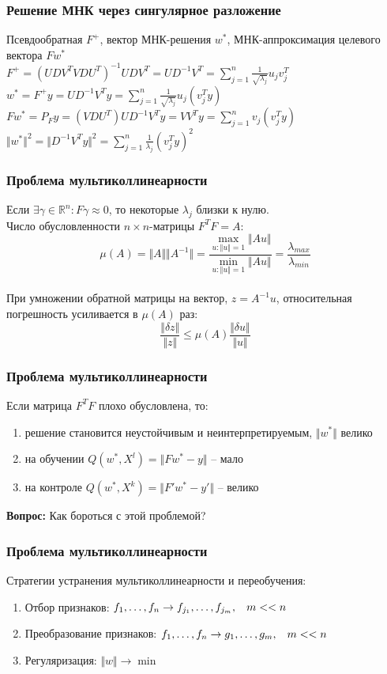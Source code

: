\documentclass[10pt]{beamer}
\begin{document}
\begin{frame}\frametitle{Решение МНК через сингулярное разложение}
	Псевдообратная $F^+$, вектор МНК-решения $w^*$,
	МНК-аппроксимация целевого вектора $Fw^*$\\
	$F^+ = (UDV^TVDU^T)^{-1}UDV^T = UD^{-1}V^T = \sum\limits_{j=1}^n \frac{1}{\sqrt{\lambda_j}}  u_j v_j^T$\\
	$ w^* = F^+y = UD^{-1}V^Ty = \sum\limits_{j=1}^n \frac{1}{\sqrt{\lambda_j}}  u_j (v_j^Ty)$\\
	$F w^* = P_F y = (VDU^T)UD^{-1}V^Ty = VV^Ty = \sum\limits_{j=1}^n v_j (v_j^Ty)$\\
	$\Vert w^* \Vert^2  = \Vert D^{-1}V^Ty \Vert^2 = \sum\limits_{j=1}^n \frac{1}{\lambda_j} (v_j^Ty)^2$
\end{frame}

\begin{frame}\frametitle{Проблема мультиколлинеарности}
	Если $\exists \gamma \in \mathbb{R}^n: F\gamma \approx 0$, то некоторые $\lambda_j$ близки к нулю.\\
	Число обусловленности $n \times n$-матрицы $F^TF = A$:
	$$\mu(A) = \Vert A \Vert \Vert A^{-1} \Vert = \frac{\max\limits_{u: \Vert u \Vert = 1} \Vert A u \Vert}{\min\limits_{u: \Vert u \Vert = 1} \Vert A u \Vert} = \frac{\lambda_{max}}{\lambda_{min}}$$\\
	При умножении обратной матрицы на вектор, $z = A^{-1}u$, относительная погрешность усиливается в $\mu(A)$ раз:\\
	$$\frac{\Vert \delta z \Vert}{\Vert z \Vert } \leq \mu(A) \frac{\Vert \delta u \Vert}{\Vert u \Vert }$$
\end{frame}

\begin{frame}\frametitle{Проблема мультиколлинеарности}
	Если матрица $F^TF$ плохо обусловлена, то: 
	\begin{enumerate}[--]
		\item решение становится неустойчивым и неинтерпретируемым, $\Vert w^* \Vert $ велико
		\item на обучении $Q(w^*, X^l) = \Vert Fw^* -y \Vert$ -- мало   
		\item на контроле $Q(w^*, X^k) = \Vert F'w^* -y' \Vert$ -- велико
	\end{enumerate}
	\textbf{Вопрос:} Как бороться с этой проблемой?
\end{frame}

\begin{frame}\frametitle{Проблема мультиколлинеарности}
	Стратегии устранения мультиколлинеарности и переобучения:
	\begin{enumerate}[--]
		\item Отбор признаков: $f_1, \dots, f_n \rightarrow f_{j_1}, \dots, f_{j_m}, \hspace{3mm} m << n$
		\item Преобразование признаков: $f_1, \dots, f_n \rightarrow g_1, \dots, g_m,\hspace{3mm}  m << n$
		\item Регуляризация: $\Vert w \Vert \rightarrow \min$
	\end{enumerate}
\end{frame}
\end{document}
